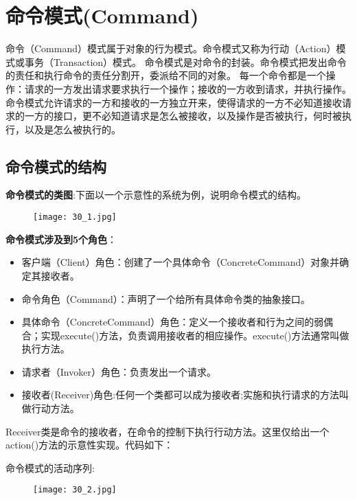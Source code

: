 \documentclass[../main.tex]{subfiles}
\begin{document}
\section{命令模式(Command)}
命令（Command）模式属于对象的行为模式。命令模式又称为行动（Action）模式或事务（Transaction）模式。
命令模式是对命令的封装。命令模式把发出命令的责任和执行命令的责任分割开，委派给不同的对象。
每一个命令都是一个操作：请求的一方发出请求要求执行一个操作；接收的一方收到请求，并执行操作。命令模式允许请求的一方和接收的一方独立开来，使得请求的一方不必知道接收请求的一方的接口，更不必知道请求是怎么被接收，以及操作是否被执行，何时被执行，以及是怎么被执行的。

\subsection{命令模式的结构}
\textbf{命令模式的类图}:下面以一个示意性的系统为例，说明命令模式的结构。
%
\begin{figure}[H]
  \texttt{[image: 30\_1.jpg]}
\end{figure}
%
\textbf{命令模式涉及到5个角色}：
\begin{itemize}
  \item 客户端（Client）角色：创建了一个具体命令（ConcreteCommand）对象并确定其接收者。
  \item 命令角色（Command）：声明了一个给所有具体命令类的抽象接口。
  \item 具体命令（ConcreteCommand）角色：定义一个接收者和行为之间的弱偶合；实现execute()方法，负责调用接收者的相应操作。execute()方法通常叫做执行方法。
  \item 请求者（Invoker）角色：负责发出一个请求。
  \item 接收者(Receiver)角色:任何一个类都可以成为接收者;实施和执行请求的方法叫做行动方法。
\end{itemize}
%

%
Receiver类是命令的接收者，在命令的控制下执行行动方法。这里仅给出一个action()方法的示意性实现。代码如下：
%




%
命令模式的活动序列:
%
\begin{figure}[H]
  \texttt{[image: 30\_2.jpg]}
\end{figure}
%
\end{document}
